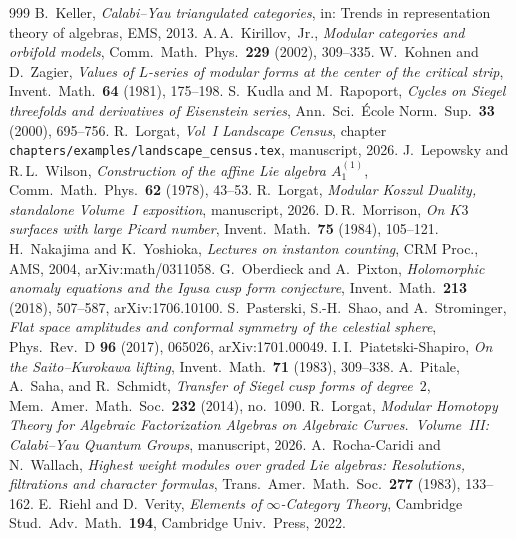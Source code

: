 \begin{thebibliography}{999}
 B.~Keller, \emph{Calabi--Yau triangulated categories}, in: Trends in representation theory of algebras, EMS, 2013.
 A.\,A.~Kirillov,~Jr., \emph{Modular categories and orbifold models}, Comm.\ Math.\ Phys.\ \textbf{229} (2002), 309--335.
 W.~Kohnen and D.~Zagier, \emph{Values of $L$-series of modular forms at the center of the critical strip}, Invent.\ Math.\ \textbf{64} (1981), 175--198.
 S.~Kudla and M.~Rapoport, \emph{Cycles on Siegel threefolds and derivatives of Eisenstein series}, Ann.\ Sci.\ \'Ecole Norm.\ Sup.\ \textbf{33} (2000), 695--756.
 R.~Lorgat, \emph{Vol~I Landscape Census}, chapter \texttt{chapters/examples/landscape\_census.tex}, manuscript, 2026.
 J.~Lepowsky and R.\,L.~Wilson, \emph{Construction of the affine Lie algebra $A_1^{(1)}$}, Comm.\ Math.\ Phys.\ \textbf{62} (1978), 43--53.
 R.~Lorgat, \emph{Modular Koszul Duality, standalone Volume~I exposition}, manuscript, 2026.
 D.\,R.~Morrison, \emph{On $K3$ surfaces with large Picard number}, Invent.\ Math.\ \textbf{75} (1984), 105--121.
 H.~Nakajima and K.~Yoshioka, \emph{Lectures on instanton counting}, CRM Proc., AMS, 2004, arXiv:math/0311058.
 G.~Oberdieck and A.~Pixton, \emph{Holomorphic anomaly equations and the Igusa cusp form conjecture}, Invent.\ Math.\ \textbf{213} (2018), 507--587, arXiv:1706.10100.
 S.~Pasterski, S.-H.~Shao, and A.~Strominger, \emph{Flat space amplitudes and conformal symmetry of the celestial sphere}, Phys.\ Rev.\ D \textbf{96} (2017), 065026, arXiv:1701.00049.
 I.\,I.~Piatetski-Shapiro, \emph{On the Saito--Kurokawa lifting}, Invent.\ Math.\ \textbf{71} (1983), 309--338.
 A.~Pitale, A.~Saha, and R.~Schmidt, \emph{Transfer of Siegel cusp forms of degree~$2$}, Mem.\ Amer.\ Math.\ Soc.\ \textbf{232} (2014), no.~1090.
 R.~Lorgat, \emph{Modular Homotopy Theory for Algebraic Factorization Algebras on Algebraic Curves.\ Volume~III: Calabi--Yau Quantum Groups}, manuscript, 2026.
 A.~Rocha-Caridi and N.~Wallach, \emph{Highest weight modules over graded Lie algebras: Resolutions, filtrations and character formulas}, Trans.\ Amer.\ Math.\ Soc.\ \textbf{277} (1983), 133--162.
 E.~Riehl and D.~Verity, \emph{Elements of $\infty$-Category Theory}, Cambridge Stud.\ Adv.\ Math.\ \textbf{194}, Cambridge Univ.\ Press, 2022.

\end{thebibliography}
